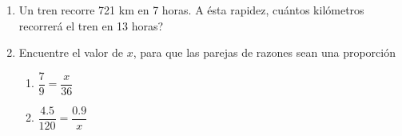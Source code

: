 \documentclass[letterpaper,fleqn]{article}
\begin{document}
\begin{enumerate}
\begin{enumerate}
\end{enumerate}
\item Un tren recorre 721 km en 7 horas. A ésta rapidez, cuántos kilómetros recorrerá el tren en 13 horas?\noanswer
\item Encuentre el valor de $x$, para que las parejas de razones sean una proporción
\begin{enumerate}
\item $\dfrac{7}{9}=\dfrac{x}{36}$\noanswer[.5in]
\item $\dfrac{4.5}{120}=\dfrac{0.9}{x}$\noanswer[.5in]
\end{enumerate}
 \end{enumerate}
\end{document}
